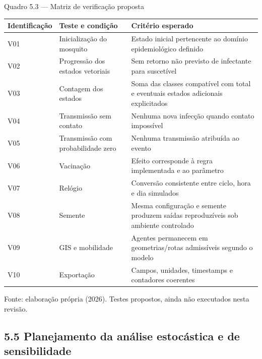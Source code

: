 Quadro 5.3 --- Matriz de verificação proposta

\begin{longtable}[]{@{}
  >{\raggedright\arraybackslash}p{}
  >{\raggedright\arraybackslash}p{}
  >{\raggedright\arraybackslash}p{}@{}}
\toprule\noalign{}
\begin{minipage}[b]{\linewidth}\raggedright
\textbf{Identificação}
\end{minipage} & \begin{minipage}[b]{\linewidth}\raggedright
\textbf{Teste e condição}
\end{minipage} & \begin{minipage}[b]{\linewidth}\raggedright
\textbf{Critério esperado}
\end{minipage} \\
\midrule\noalign{}
\endhead
\bottomrule\noalign{}
\endlastfoot
V01 & Inicialização do mosquito & Estado inicial pertencente ao domínio
epidemiológico definido \\
V02 & Progressão dos estados vetoriais & Sem retorno não previsto de
infectante para suscetível \\
V03 & Contagem dos estados & Soma das classes compatível com total e
eventuais estados adicionais explicitados \\
V04 & Transmissão sem contato & Nenhuma nova infecção quando contato
impossível \\
V05 & Transmissão com probabilidade zero & Nenhuma transmissão atribuída
ao evento \\
V06 & Vacinação & Efeito corresponde à regra implementada e ao
parâmetro \\
V07 & Relógio & Conversão consistente entre ciclo, hora e dia
simulados \\
V08 & Semente & Mesma configuração e semente produzem saídas
reproduzíveis sob ambiente controlado \\
V09 & GIS e mobilidade & Agentes permanecem em geometrias/rotas
admissíveis segundo o modelo \\
V10 & Exportação & Campos, unidades, timestamps e contadores
coerentes \\
\end{longtable}

Fonte: elaboração própria (2026). Testes propostos, ainda não executados
nesta revisão.

\subsection{5.5 Planejamento da análise estocástica e de
sensibilidade}\label{planejamento-da-anuxe1lise-estocuxe1stica-e-de-sensibilidade}

